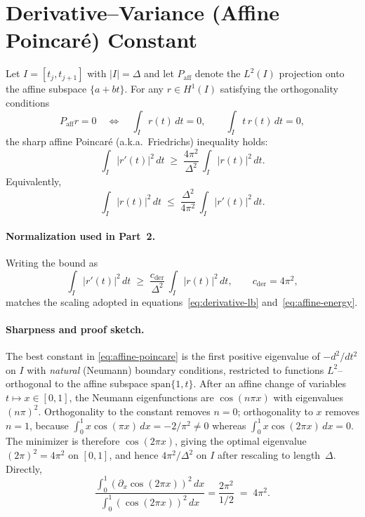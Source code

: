 \section{Derivative–Variance (Affine Poincaré) Constant}
\label{app:B}

Let $I=[t_j,t_{j+1}]$ with $|I|=\Delta$ and let $P_{\mathrm{aff}}$ denote the $L^2(I)$
projection onto the affine subspace $\{a+bt\}$. For any $r\in H^1(I)$ satisfying the
orthogonality conditions
\[
P_{\mathrm{aff}} r = 0
\quad\Longleftrightarrow\quad
\int_I r(t)\,dt=0,\qquad \int_I t\,r(t)\,dt=0,
\]
the sharp affine Poincaré (a.k.a.\ Friedrichs) inequality holds:
\begin{equation}
\int_I |r'(t)|^2\,dt \;\ge\; \frac{4\pi^2}{\Delta^2}\,\int_I |r(t)|^2\,dt.
\label{eq:affine-poincare}
\end{equation}
Equivalently,
\[
\int_I |r(t)|^2\,dt \;\le\; \frac{\Delta^2}{4\pi^2}\,\int_I |r'(t)|^2\,dt.
\]

\paragraph{Normalization used in Part~2.}
Writing the bound as
\begin{equation}
\int_I |r'(t)|^2\,dt \;\ge\; \frac{c_{\mathrm{der}}}{\Delta^2}\,\int_I |r(t)|^2\,dt,
\qquad c_{\mathrm{der}}=4\pi^2,
\label{eq:cder}
\end{equation}
matches the scaling adopted in equations~\eqref{eq:derivative-lb} and~\eqref{eq:affine-energy}.

\paragraph{Sharpness and proof sketch.}
The best constant in \eqref{eq:affine-poincare} is the first positive eigenvalue
of $-d^2/dt^2$ on $I$ with \emph{natural} (Neumann) boundary conditions, restricted to
functions $L^2$–orthogonal to the affine subspace $\mathrm{span}\{1,t\}$.
After an affine change of variables $t\mapsto x\in[0,1]$, the Neumann eigenfunctions are
$\cos(n\pi x)$ with eigenvalues $(n\pi)^2$. Orthogonality to the constant removes $n=0$;
orthogonality to $x$ removes $n=1$, because
$\int_0^1 x\cos(\pi x)\,dx=-2/\pi^2\neq 0$ whereas $\int_0^1 x\cos(2\pi x)\,dx=0$.
The minimizer is therefore $\cos(2\pi x)$, giving the optimal eigenvalue
$(2\pi)^2=4\pi^2$ on $[0,1]$, and hence $4\pi^2/\Delta^2$ on $I$ after rescaling to
length~$\Delta$. Directly,
\[
\frac{\int_0^1 (\partial_x \cos(2\pi x))^2\,dx}{\int_0^1 (\cos(2\pi x))^2\,dx}
= \frac{2\pi^2}{1/2} \;=\; 4\pi^2 .
\]

